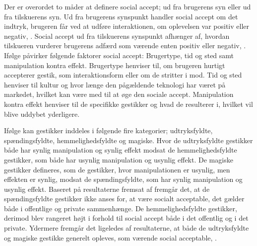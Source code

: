 %
Der er overordet to måder at definere social accept; ud fra brugerens syn eller ud fra tilskuerens syn. Ud fra brugerens synspunkt handler social accept om det indtryk, brugeren får ved at udføre interaktionen, om oplevelsen var positiv eller negativ, \parencite[s. 276]{PDF:WouldYouDoThat}. Social accept ud fra tilskuerens synspunkt afhænger af, hvordan tilskueren vurderer brugerens adfærd som værende enten positiv eller negativ, \parencite[s. 276]{PDF:WouldYouDoThat}. Ifølge \textcite[s. 276]{PDF:WouldYouDoThat} påvirker følgende faktorer social accept: Brugertype, tid og sted samt manipulation kontra effekt. Brugertype henviser til, om brugeren hurtigt accepterer gestik, som interaktionsform eller om de stritter i mod. Tid og sted henviser til kultur og hvor længe den pågældende teknologi har været på markedet, hvilket kan være med til at øge den sociale accept. Manipulation kontra effekt henviser til de specifikke gestikker og hvad de resulterer i, hvilket vil blive uddybet yderligere.

Ifølge \textcite[s. 276]{PDF:WouldYouDoThat} kan gestikker inddeles i følgende fire kategorier; udtryksfyldte, spændingsfyldte, hemmelighedsfyldte og magiske. Hvor de udtryksfyldte gestikker både har synlig manipulation og synlig effekt modsat de hemmelighedsfyldte gestikker, som både har usynlig manipulation og usynlig effekt. De magiske gestikker defineres, som de gestikker, hvor manipulationen er usynlig, men effekten er synlig, modsat de spændingsfyldte, som har synlig manipulation og usynlig effekt. Baseret på resultaterne fremsat af \textcite[s. 277]{PDF:WouldYouDoThat} fremgår det, at de spændingsfyldte gestikker ikke anses for, at være socialt acceptable, det gælder både i offentlige og private sammenhænge. De hemmelighedsfyldte gestikker, derimod blev rangeret højt i forhold til social accept både i det offentlig og i det private. Ydermere fremgår det ligeledes af resultaterne, at både de udtryksfyldte og magiske gestikke generelt opleves, som værende social acceptable, \parencite[s. 277]{PDF:WouldYouDoThat}. 

